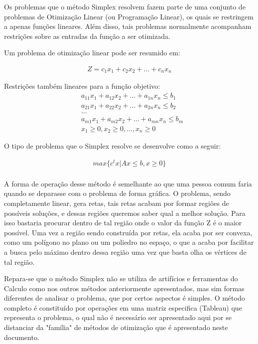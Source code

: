 Os problemas que o método Simplex resolvem fazem parte de uma conjunto de
problemas de Otimização Linear (ou Programação Linear), os quais se restringem
a apenas funções lineares. Além disso, tais problemas normalmente acompanham
restrições sobre as entradas da função a ser otimizada.

Um problema de otimização linear pode ser resumido em:

\begin{equation}
    \begin{split}
        Z = c_1x_1 + c_2x_2 + … + c_nx_n
    \end{split}
\end{equation}

Restrições também lineares para a função objetivo:
\begin{equation}
    \begin{split}
        &   a_{11}x_1 + a_{12}x_2 + … + a_{1n}x_n \leq b_1\\
        &   a_{21}x_1 + a_{22}x_2 + … + a_{2n}x_n \leq b_2\\
        &   ...\\
        &   a_{m1}x_1 + a_{m2}x_2 + … + a_{mn}x_n \leq b_m\\
        &   x_1 \geq 0, x_2 \geq 0, …, x_n \geq 0
    \end{split}
\end{equation}

O tipo de problema que o Simplex resolve se desenvolve como a seguir:

\begin{equation}
    \begin{split}
        max \{c^tx | Ax \leq b, x \geq 0\}\\
    \end{split}
\end{equation}


A forma de operação desse método é semelhante ao que uma pessoa comum faria
quando se deparasse com o problema de forma gráfica. O problema, sendo
completamente linear, gera retas, tais retas acabam por formar regiões de 
possíveis soluções, e dessas regiões queremos saber qual a melhor solução.
Para isso bastaria procurar dentro de tal região onde o valor da função Z é o
maior possível. Uma vez a região sendo construída por retas, ela acaba por ser
convexa, como um polígono no plano ou um poliedro no espaço, o que a acaba por
facilitar a busca pelo máximo dentro dessa região uma vez que basta olha os 
vértices de tal região.

Repara-se que o método Simplex não se utiliza de artifícios e ferramentas do
Calculo como nos outros métodos anteriormente apresentados, mas sim formas
diferentes de analisar o problema, que por certos aspectos é simples. O método
completo é constituído por operações em uma matriz especifica (Tableau) que
representa o problema, o qual não é necessário ser apresentado aqui por se
distanciar da "família" de métodos de otimização que é apresentado neste
documento.



